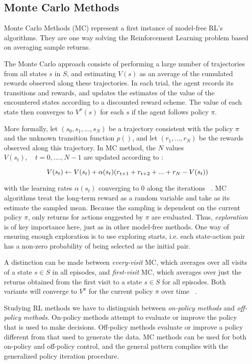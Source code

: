 \subsection{Monte Carlo Methods} Monte Carlo Methods (MC)  represent a first instance of model-free RL's algorithms. They are one way solving the Reinforcement Learning problem based on averaging sample returns.

The Monte Carlo approach consists of performing a large number of trajectories from all states $s$ in $S$, and estimating $V(s)$ as an average of the cumulated rewards observed along these trajectories. In each trial, the agent records its transitions and rewards, and updates the estimates of the value of the  encountered states according to a discounted reward scheme. The value of each state then converges to $V^\pi (s)$ for each $s$ if the agent follows policy $\pi$.

More formally, let $(s_0, s_1, ..., s_N)$ be a trajectory consistent with the policy $\pi$ and the unknown transition function $p()$, and let $(r_1, ..., r_N)$ be the rewards observed along this trajectory. In MC method, the $N$ values $V(s_t), \quad t = 0, ...., N-1$ are updated according to :

\begin{equation} 
\label{eq:2.6}
V(s_t) \leftarrow V(s_t) + \alpha(s_t)(r\textsubscript{t+1} + r\textsubscript{t+2} + ... + r_N - V(s_t))
\end{equation}

with the learning rates $\alpha(s_t)$ converging to $0$ along the iterations~\cite{Sigaud:2010:MDP:1841781} . MC algorithms treat the long-term reward as a random variable and take as its estimate the sampled mean. Because the sampling is dependent on the current policy $\pi$, only returns for actions suggested by $\pi$ are evaluated. Thus, \textit{exploration} is of key importance here, just as in other model-free methods. One way of ensuring enough exploration is to use exploring starts, i.e. each state-action pair has a non-zero probability of being selected as the initial pair.

A distinction can be made between \textit{every-visit} MC, which averages over all visits of a state $s \in S$ in all episodes, and \textit{first-visit} MC, which averages over just the returns obtained from the first visit to a state $s \in S$ for all episodes. Both variants will
converge to $V^\pi$ for the current policy $\pi$ over time~\cite{wiering2012reinforcement} .

Studying RL methods we have to distinguish between \textit{on-policy methods} and \textit{off-policy methods}.
On-policy methods attempt to evaluate or improve the policy that is used to make decisions. Off-policy methods evaluate or improve a policy different from that used to generate the data. MC methods can be used for both on-policy and off-policy control, and the general pattern complies with the generalized policy iteration procedure. 

